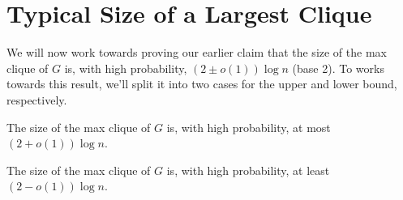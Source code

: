 \documentclass{article}
\begin{document}
\section{Typical Size of a Largest Clique}
We will now work towards proving our earlier claim that the size of the max
clique of $G$ is, with high probability, $(2 \pm o(1)) \log{n}$ (base 2). To
works towards this result, we'll split it into two cases for the upper and lower
bound, respectively.

\begin{claim}
    \label{upper-bound}
    The size of the max clique of $G$ is, with high probability, at most $(2 +
    o(1)) \log{n}$.
\end{claim}
\begin{claim}
    \label{lower-bound}
    The size of the max clique of $G$ is, with high probability, at least $(2 -
    o(1)) \log{n}$.
\end{claim}
\end{document}
